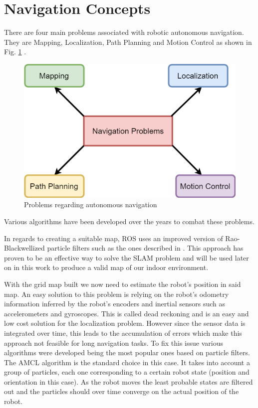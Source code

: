 \section {Navigation Concepts}
There are four main problems associated with robotic autonomous navigation. They are Mapping, Localization, Path Planning and Motion Control \cite{nav} as shown in Fig. \ref{fig:probNav} . 

\begin{figure}[ht!] 
\centerline{\includegraphics [width=0.6 \textwidth]{imgs/chapter3/navprobs.png}}
\caption{Problems regarding autonomous navigation}
\label{fig:probNav}
\end{figure}
Various algorithms have been developed over the years to combat these problems. 

In regards to creating a suitable map,  \ac{ROS}  uses an improved version of  Rao-Blackwellized particle filters such as the ones described in \cite{grisetti2007improved}. This approach has proven to be an effective way to solve the \ac{SLAM} problem and will be used later on in this work to produce a valid map of our indoor environment.

With the grid map built we now need to estimate the robot's position in said map. 
An easy solution to this problem is relying on the robot's odometry information inferred by the robot's encoders and inertial sensors such as accelerometers and gyroscopes. This is called dead reckoning and is an easy and low cost solution for the localization problem. However since the sensor data is integrated over time, this leads to the accumulation of errors which make this approach not feasible for long navigation tasks. 
To fix this issue various algorithms were developed being the most popular ones based on particle filters. The \ac{AMCL} \cite{amclpaper} algorithm  is the standard choice in this case. It takes into account a group of particles, each one corresponding to a certain robot state (position and orientation in this case). As the robot moves the least probable states are filtered out and  the particles should over time converge on the actual position of the robot.  

